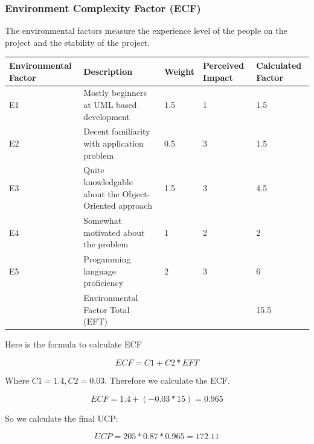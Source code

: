 \documentclass[letterpaper,english, 12pt]{scrreprt}
\begin{document}
\subsubsection{Environment Complexity Factor (ECF)}

The environmental factors measure the experience level of the people on the project and the stability of the project. 

\begin{center}
        \begin{tabular}{|C{3cm}|C{5cm}|C{1.5cm}|C{2cm}|C{2cm}|}
                \hline
                        Environmental Factor & Description & Weight & Perceived Impact & Calculated Factor \\
                \hline
                        E1 & Mostly beginners at UML based development & 1.5 & 1 & 1.5 \\
                \hline
                        E2 & Decent familiarity with application problem& 0.5 & 3 & 1.5\\
                \hline
                        E3 & Quite knowledgable about the Object-Oriented approach & 1.5 & 3 & 4.5 \\
                \hline
                        E4 & Somewhat motivated about the problem & 1 & 2 & 2 \\
                \hline
                        E5 & Progamming language proficiency & 2 & 3 & 6 \\
                \hline
                           & Environmental Factor Total (EFT) & & & 15.5 \\
                \hline
        \end{tabular}
\end{center}

Here is the formula to calculate ECF

\begin{equation}
ECF = C1 + C2 * EFT
\end{equation}

Where $C1 = 1.4, C2 = 0.03$.  Therefore we calculate the ECF.

\begin{equation}
ECF = 1.4 + (-0.03*15)=0.965
\end{equation}

So we calculate the final UCP:

\begin{equation}
UCP = 205*0.87*0.965 = 172.11
\end{equation}
\end{document}
